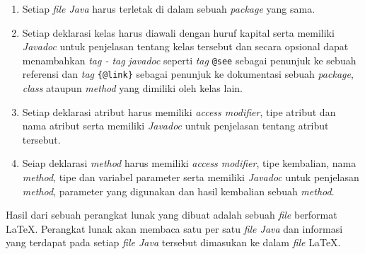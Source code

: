 \begin{enumerate}
	\item Setiap {\it file Java} harus terletak di dalam sebuah {\it package} yang sama.
	\item Setiap deklarasi kelas harus diawali dengan huruf kapital serta memiliki {\it Javadoc} untuk penjelasan tentang kelas tersebut dan secara opsional dapat menambahkan {\it tag - tag} {\it javadoc} seperti {\it tag} \texttt{@see} sebagai penunjuk ke sebuah referensi dan {\it tag} \texttt{\{@link\}} sebagai penunjuk ke dokumentasi sebuah {\it package}, {\it class} ataupun {\it method} yang dimiliki oleh kelas lain.
	\item Setiap deklarasi atribut harus memiliki {\it access modifier}, tipe atribut dan nama atribut serta memiliki {\it Javadoc} untuk penjelasan tentang atribut tersebut.
	\item Seiap deklarasi {\it method} harus memiliki {\it access modifier}, tipe kembalian, nama {\it method}, tipe dan variabel parameter serta memiliki {\it Javadoc} untuk penjelasan {\it method}, parameter yang digunakan dan hasil kembalian sebuah {\it method}.
\end{enumerate}

Hasil dari sebuah perangkat lunak yang dibuat adalah sebuah {\it file} berformat \LaTeX. Perangkat lunak akan membaca satu per satu {\it file Java} dan informasi yang terdapat pada setiap {\it file Java} tersebut dimasukan ke dalam {\it file} \LaTeX.

